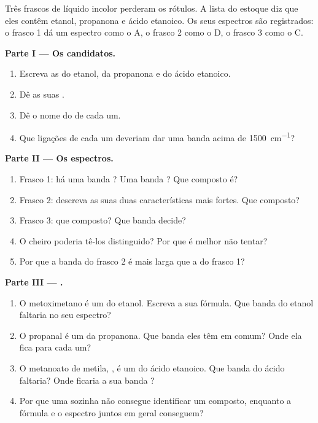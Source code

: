 \begin{problem}
\label{pb:g11:infrared:1}
Três frascos de líquido incolor perderam os rótulos. A lista do estoque
diz que eles contêm etanol, propanona e ácido etanoico. Os seus espectros
são registrados: o frasco 1 dá um espectro como o A, o frasco 2 como o
D, o frasco 3 como o C.

\medskip
\noindent\textbf{Parte I --- Os candidatos.}
\begin{enumerate}
  \item Escreva as  do etanol, da
        propanona e do ácido etanoico.
  \item Dê as suas .
  \item Dê o nome do  de cada um.
  \item Que ligações de cada um deveriam dar uma banda acima de
        \qty{1500}{cm^{-1}}?
\end{enumerate}

\medskip
\noindent\textbf{Parte II --- Os espectros.}
\begin{enumerate}[resume]
  \item Frasco 1: há uma banda ? Uma banda ? Que composto
        é?
  \item Frasco 2: descreva as suas duas características mais fortes. Que
        composto?
  \item Frasco 3: que composto? Que banda decide?
  \item O cheiro poderia tê-los distinguido? Por que é melhor não tentar?
  \item Por que a banda  do frasco 2 é mais larga que a do
        frasco 1?
\end{enumerate}

\medskip
\noindent\textbf{Parte III --- .}
\begin{enumerate}[resume]
  \item O metoximetano é um  do etanol. Escreva a sua fórmula. Que
        banda do etanol faltaria no seu espectro?
  \item O propanal é um  da propanona. Que banda eles têm em
        comum? Onde ela fica para cada um?
  \item O metanoato de metila, , é um  do ácido
        etanoico. Que banda do ácido faltaria? Onde ficaria a sua banda
        ?
  \item Por que uma  sozinha não consegue identificar um
        composto, enquanto a fórmula e o espectro juntos em geral
        conseguem?
\end{enumerate}


\end{problem}
